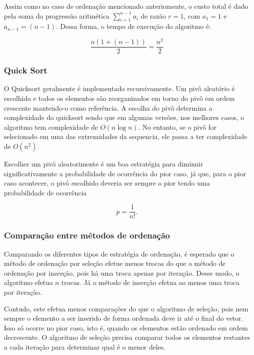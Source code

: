 \documentclass[
]{article}
\begin{document}
Assim como no caso de ordenação mencionado anteriomente, o custo total é
dado pela soma da progressão aritmética
\(\sum\limits_{i = 1}^{n-1} a_i\) de razão \(r = 1\), com \(a_1 = 1\) e
\(a_{n-1} = (n-1)\). Dessa forma, o tempo de execução do algoritmo é:

\begin{equation}
  \frac{n(1+(n-1))}{2} = \frac{n^2}{2}
\end{equation}

\hypertarget{quick-sort}{%
\subsubsection{Quick Sort}\label{quick-sort}}

O Quicksort geralmente é implementado recursivamente. Um pivô aleatório
é escolhido e todos os elementos são reorganizados em torno do pivô em
ordem crescente mantendo-o como referência. A escolha do pivô determina
a complexidade do quicksort sendo que em algumas versões, nos melhores
casos, o algoritmo tem complexidade de \(O(n \log n)\). No entanto, se o
pivô for selecionado em uma das extremidades da sequencia, ele passa a
ter complexidade de \(O(n^2)\).

Escolher um pivô aleatorimente é um boa estratégia para diminuir
significativamente a probabilidade de ocorrência do pior caso, já que,
para o pior caso acontecer, o pivô escolhido deveria ser sempre o pior
tendo uma probabilidade de ocorrência

\begin{equation}
  p = \frac{1}{n!}.
\end{equation}

\hypertarget{sec144}{%
\subsubsection{Comparação entre métodos de ordenação}\label{sec144}}

Comparando os diferentes tipos de estratégia de ordenação, é esperado
que o método de ordenação por seleção efetue menos trocas do que o
método de ordenação por inserção, pois há uma troca apenas por iteração.
Desse modo, o algoritmo efetua \(n\) trocas. Já o método de inserção
efetua ao menos uma troca por iteração.

Contudo, este efetua menos comparações do que o algoritmo de seleção,
pois nem sempre o elemento a ser inserido de forma ordenada deve ir até
o final do vetor. Isso só ocorre no pior caso, isto é, quando os
elementos estão ordenado em ordem decrescente. O algoritmo de seleção
precisa comparar todos os elementos restantes a cada iteração para
determinar qual é o menor deles.
\end{document}
